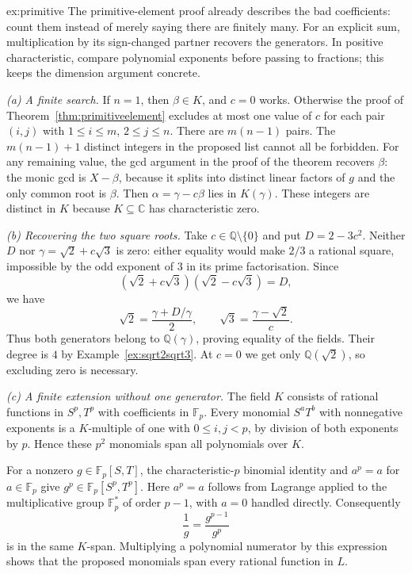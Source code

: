 \begin{solution}{ex:primitive}
\idea The primitive-element proof already describes the bad coefficients:
count them instead of merely saying there are finitely many. For an explicit
sum, multiplication by its sign-changed partner recovers the generators.
In positive characteristic, compare polynomial exponents before passing to
fractions; this keeps the dimension argument concrete.

\writeup \emph{(a) A finite search.}
If $n=1$, then $\beta\in K$, and $c=0$ works. Otherwise the proof of
Theorem~\ref{thm:primitiveelement} excludes at most one value of $c$ for each
pair $(i,j)$ with $1\le i\le m$, $2\le j\le n$. There are $m(n-1)$ pairs.
The $m(n-1)+1$ distinct integers in the proposed list cannot all be forbidden.
For any remaining value, the gcd argument in the proof of the theorem recovers $\beta$: the monic gcd is $X-\beta$, because it splits into distinct linear factors of $g$ and the only common root is $\beta$. Then $\alpha=\gamma-c\beta$ lies in $K(\gamma)$. These integers are distinct in $K$ because
$K\subseteq\mathbb C$ has characteristic zero.

\emph{(b) Recovering the two square roots.}
Take $c\in\mathbb Q\setminus\{0\}$ and put $D=2-3c^2$. Neither $D$ nor
$\gamma=\sqrt2+c\sqrt3$ is zero: either equality would make $2/3$ a rational
square, impossible by the odd exponent of $3$ in its prime factorisation.
Since
\[
(\sqrt2+c\sqrt3)(\sqrt2-c\sqrt3)=D,
\]
we have
\[
\boxed{\sqrt2=\frac{\gamma+D/\gamma}{2},\qquad
\sqrt3=\frac{\gamma-\sqrt2}{c}.}
\]
Thus both generators belong to $\mathbb Q(\gamma)$, proving equality of the
fields. Their degree is $4$ by Example~\ref{ex:sqrt2sqrt3}. At $c=0$ we get
only $\mathbb Q(\sqrt2)$, so excluding zero is necessary.

\emph{(c) A finite extension without one generator.}
The field $K$ consists of rational functions in $S^p,T^p$ with coefficients
in $\mathbb F_p$. Every monomial $S^aT^b$ with nonnegative exponents is a
$K$-multiple of one with $0\le i,j<p$, by division of both exponents by $p$.
Hence these $p^2$ monomials span all polynomials over $K$.

For a nonzero $g\in\mathbb F_p[S,T]$, the characteristic-$p$ binomial identity
and $a^p=a$ for $a\in\mathbb F_p$ give $g^p\in\mathbb F_p[S^p,T^p]$.
Here $a^p=a$ follows from Lagrange applied to the multiplicative group
$\mathbb F_p^*$ of order $p-1$, with $a=0$ handled directly. Consequently
\[
\frac1g=\frac{g^{p-1}}{g^p}
\]
is in the same $K$-span. Multiplying a polynomial numerator by this expression
shows that the proposed monomials span every rational function in $L$.


\end{solution}
